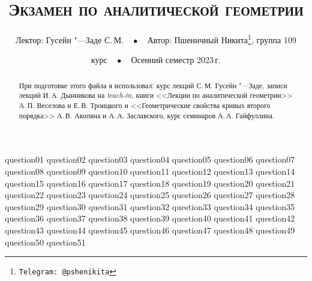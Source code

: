 \documentclass[a4paper, 11pt]{article}
\begin{document}
\title{\bfseries\scshape Экзамен по аналитической геометрии}
\author{Лектор: Гусейн "---Заде С.\,М.$\quad\bullet\quad$Автор: Пшеничный Никита\thanks{\texttt{Telegram: @pshenikita}}, группа 109}
\date{ курс$\quad\bullet\quad$Осенний семестр 2023\,г.}

\maketitle

\begin{abstract}
    При подготовке этого файла я использовал: курс лекций С.\,М. Гусейн "---Заде, записи лекций И.\,А. Дынникова на \textit{teach-in}, книги <<Лекции по аналитической геометрии>> А.\,П. Веселова и Е.\,В. Троицкого и <<Геометрические свойства кривых второго порядка>> А.\,В. Акопяна и А.\,А. Заславского, курс семинаров А.\,А. Гайфуллина.
\end{abstract}

\tableofcontents

{question01}
{question02}
{question03}
{question04}
{question05}
{question06}
{question07}
{question08}
{question09}
{question10}
{question11}
{question12}
{question13}
{question14}
{question15}
{question16}
{question17}
{question18}
{question19}
{question20}
{question21}
{question22}
{question23}
{question24}
{question25}
{question26}
{question27}
{question28}
{question29}
{question30}
{question31}
{question32}
{question33}
{question34}
{question35}
{question36}
{question37}
{question38}
{question39}
{question40}
{question41}
{question42}
{question43}
{question44}
{question45}
{question46}
{question47}
{question48}
{question49}
{question50}
{question51}
\end{document}

